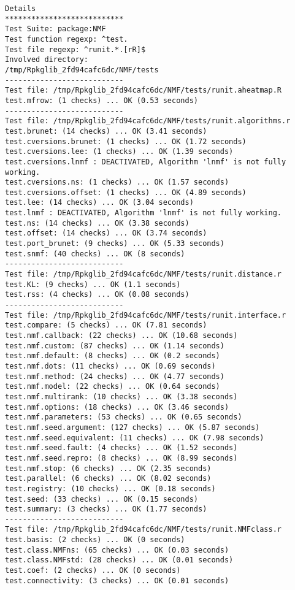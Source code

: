 \documentclass[10pt]{article}
\begin{document}
\begin{verbatim}
Details 
*************************** 
Test Suite: package:NMF 
Test function regexp: ^test. 
Test file regexp: ^runit.*.[rR]$ 
Involved directory: 
/tmp/Rpkglib_2fd94cafc6dc/NMF/tests 
--------------------------- 
Test file: /tmp/Rpkglib_2fd94cafc6dc/NMF/tests/runit.aheatmap.R 
test.mfrow: (1 checks) ... OK (0.53 seconds)
--------------------------- 
Test file: /tmp/Rpkglib_2fd94cafc6dc/NMF/tests/runit.algorithms.r 
test.brunet: (14 checks) ... OK (3.41 seconds)
test.cversions.brunet: (1 checks) ... OK (1.72 seconds)
test.cversions.lee: (1 checks) ... OK (1.39 seconds)
test.cversions.lnmf : DEACTIVATED, Algorithm 'lnmf' is not fully working.
test.cversions.ns: (1 checks) ... OK (1.57 seconds)
test.cversions.offset: (1 checks) ... OK (4.89 seconds)
test.lee: (14 checks) ... OK (3.04 seconds)
test.lnmf : DEACTIVATED, Algorithm 'lnmf' is not fully working.
test.ns: (14 checks) ... OK (3.38 seconds)
test.offset: (14 checks) ... OK (3.74 seconds)
test.port_brunet: (9 checks) ... OK (5.33 seconds)
test.snmf: (40 checks) ... OK (8 seconds)
--------------------------- 
Test file: /tmp/Rpkglib_2fd94cafc6dc/NMF/tests/runit.distance.r 
test.KL: (9 checks) ... OK (1.1 seconds)
test.rss: (4 checks) ... OK (0.08 seconds)
--------------------------- 
Test file: /tmp/Rpkglib_2fd94cafc6dc/NMF/tests/runit.interface.r 
test.compare: (5 checks) ... OK (7.81 seconds)
test.nmf.callback: (22 checks) ... OK (10.68 seconds)
test.nmf.custom: (87 checks) ... OK (1.14 seconds)
test.nmf.default: (8 checks) ... OK (0.2 seconds)
test.nmf.dots: (11 checks) ... OK (0.69 seconds)
test.nmf.method: (24 checks) ... OK (4.77 seconds)
test.nmf.model: (22 checks) ... OK (0.64 seconds)
test.nmf.multirank: (10 checks) ... OK (3.38 seconds)
test.nmf.options: (18 checks) ... OK (3.46 seconds)
test.nmf.parameters: (53 checks) ... OK (0.65 seconds)
test.nmf.seed.argument: (127 checks) ... OK (5.87 seconds)
test.nmf.seed.equivalent: (11 checks) ... OK (7.98 seconds)
test.nmf.seed.fault: (4 checks) ... OK (1.52 seconds)
test.nmf.seed.repro: (8 checks) ... OK (8.99 seconds)
test.nmf.stop: (6 checks) ... OK (2.35 seconds)
test.parallel: (6 checks) ... OK (8.02 seconds)
test.registry: (10 checks) ... OK (0.18 seconds)
test.seed: (33 checks) ... OK (0.15 seconds)
test.summary: (3 checks) ... OK (1.77 seconds)
--------------------------- 
Test file: /tmp/Rpkglib_2fd94cafc6dc/NMF/tests/runit.NMFclass.r 
test.basis: (2 checks) ... OK (0 seconds)
test.class.NMFns: (65 checks) ... OK (0.03 seconds)
test.class.NMFstd: (28 checks) ... OK (0.01 seconds)
test.coef: (2 checks) ... OK (0 seconds)
test.connectivity: (3 checks) ... OK (0.01 seconds)

\end{verbatim}
\end{document}
